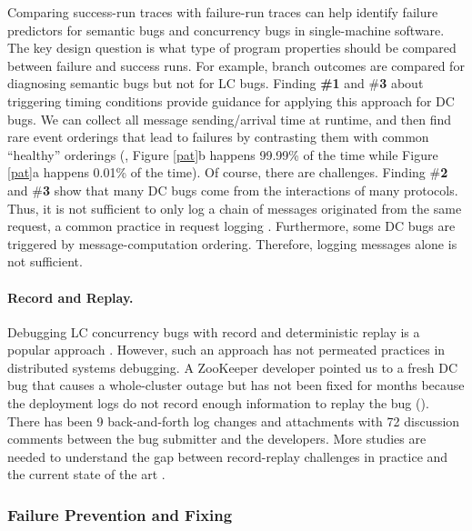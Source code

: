 Comparing success-run traces with failure-run traces can help identify
failure predictors for semantic bugs \cite{liblit03} 
and concurrency bugs \cite{cci.oopsla10}
in single-machine software.  The key
design question is what type of program properties should be
compared between failure and success runs. For example, branch
outcomes are compared for diagnosing semantic bugs but not for LC bugs.
%
%
Finding {\bf \#1} and \#{\bf 3} about triggering timing conditions
provide guidance for applying this approach for DC bugs. We can
collect all message sending/arrival time at runtime, and then find
rare event orderings that lead to failures by contrasting them with
common ``healthy'' orderings (\eg, Figure \ref{pat}b happens 99.99\%
of the time while Figure \ref{pat}a happens 0.01\% of the time).
%
%
Of course, there are challenges. Finding \#{\bf 2} and \#{\bf 3}
show that many DC bugs come from the interactions of
many protocols. Thus, it is not sufficient to only log a chain of messages
originated from the same request, a common practice in request logging
\cite{Chow+14-Mysterymachine}.  Furthermore, some DC bugs are triggered by
message-computation ordering. Therefore, logging messages alone is
not sufficient.

\paragraph{Record and Replay.}

Debugging LC concurrency bugs with record and deterministic replay is
a popular approach \cite{quickrec.isca13,
  doubleplay.asplos11}.  However, such an approach has not permeated
practices in distributed systems debugging.  A ZooKeeper developer
pointed us to a fresh DC bug that causes a whole-cluster outage but
has not been fixed for months because the deployment logs do not
record enough information to replay the bug ().  There has
been 9 back-and-forth log changes and attachments with 72 discussion
comments between the bug submitter and the developers.  More studies
are needed to understand the gap between record-replay challenges in
practice and the current state of the art \cite{Geels+06-Liblog,
  Liu+07-WiDS}.

\subsubsection{Failure Prevention and Fixing}
\label{less-runtime}


